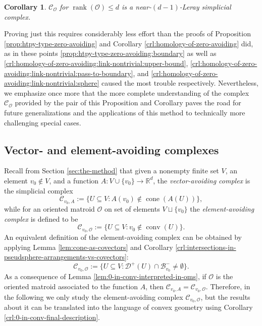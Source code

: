 \documentclass[a4paper,11pt,reqno, english]{amsart}
\newtheorem{corollary}[theorem]{Corollary}
\theoremstyle{definition}
\theoremstyle{remark}
\newcommand\R{\mathbb R}
\DeclareMathOperator{\cone}{\mathrm{cone}}
\DeclareMathOperator{\conv}{\mathrm{conv}}
\begin{document}
\begin{corollary}\label{crl:support-near-leray}
    $\mathscr{C}_\mathscr{O}$ for $\operatorname{rank}(\mathscr{O})\leq d$ is a near-$(d-1)$-Leray simplicial complex.
\end{corollary}
Proving just this requires considerably less effort than the proofs of Proposition \ref{prop:htpy-type-zero-avoiding} and Corollary \ref{crl:homology-of-zero-avoiding} did, as in these points \ref{prop:htpy-type-zero-avoiding:boundary} as well as \ref{crl:homology-of-zero-avoiding:link-nontrivial:upper-bound}, \ref{crl:homology-of-zero-avoiding:link-nontrivial:pass-to-boundary}, and \ref{crl:homology-of-zero-avoiding:link-nontrivial:sphere} caused the most trouble respectively. Nevertheless, we emphasize once more that the more complete understanding of the complex $\mathscr{C}_\mathscr{O}$ provided by the pair of this Proposition and Corollary paves the road for future generalizations and the applications of this method to technically more challenging special cases.


\medskip
\subsection{Vector- and element-avoiding complexes}\label{sec:avoiding-complexes:vector}
\medskip

Recall from Section \ref{sec:the-method} that given a nonempty finite set $V$, an element $v_0\notin V$, and a function $A\colon {V\cup\{v_0\}}\to\R^d$, the \emph{vector-avoiding complex} is the simplicial complex
\[
    \mathscr{C}_{v_0,A}:=\{U\subseteq V:A(v_0)\notin\cone(A(U))\},
\]
while for an oriented matroid $\mathscr{O}$ on set of elements $V\sqcup\{v_0\}$ the \emph{element-avoiding complex} is defined to be
\[
    \mathscr{C}_{v_0,\mathscr{O}}:=\{U\subseteq V: v_0\notin\conv(U)\}.
\]
An equivalent definition of the element-avoiding complex can be obtained by applying Lemma \ref{lem:cone-as-covectors} and Corollary \ref{crl:intersections-in-pseudsphere-arrangements-vs-covectors}:
\[
    \mathscr{C}_{v_0,\mathscr{O}}:=\{U\subseteq V: \mathscr{D}^+(U)\cap\mathscr{B}^-_{v_0}\neq\emptyset\}.
\]
As a consequence of Lemma \ref{lem:0-in-conv-interpreted-in-oms}, if $\mathscr{O}$ is the oriented matroid associated to the function $A$, then $\mathscr{C}_{v_0,A}=\mathscr{C}_{v_0,\mathscr{O}}$. Therefore, in the following we only study the element-avoiding complex $\mathscr{C}_{v_0,\mathscr{O}}$, but the results about it can be translated into the language of convex geometry using Corollary \ref{crl:0-in-conv-final-description}. 
\end{document}
